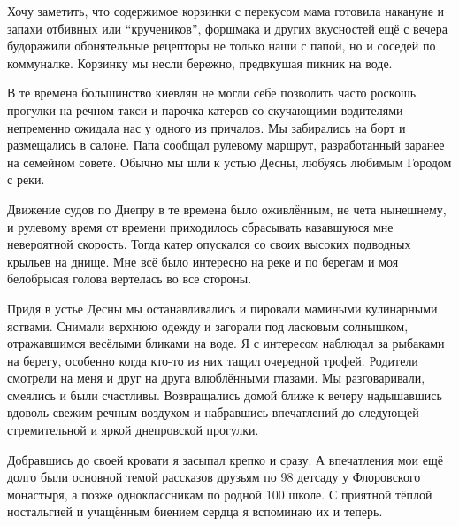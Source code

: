Хочу заметить, что содержимое корзинки с перекусом мама готовила накануне и
запахи отбивных или \enquote{кручеников}, форшмака и других вкусностей ещё с
вечера будоражили обонятельные рецепторы не только наши с папой, но и соседей
по коммуналке. Корзинку мы несли бережно, предвкушая пикник на воде. 

В те времена большинство киевлян не могли себе позволить часто роскошь прогулки
на речном такси и парочка катеров со скучающими водителями непременно ожидала
нас у одного из причалов. Мы забирались на борт и размещались в салоне. Папа
сообщал рулевому маршрут, разработанный заранее на семейном совете. Обычно мы
шли к устью Десны, любуясь любимым Городом с реки.

Движение судов по Днепру в те времена было оживлённым, не чета нынешнему, и
рулевому время от времени приходилось сбрасывать казавшуюся мне невероятной
скорость. Тогда катер опускался со своих высоких подводных крыльев на днище.
Мне всё было интересно на реке и по берегам и моя белобрысая голова вертелась
во все стороны. 

Придя в устье Десны мы останавливались и пировали мамиными кулинарными яствами.
Снимали верхнюю одежду и загорали под ласковым солнышком, отражавшимся весёлыми
бликами на воде. Я с интересом наблюдал за рыбаками на берегу, особенно когда
кто-то из них тащил очередной трофей. Родители смотрели на меня и друг на друга
влюблёнными глазами. Мы разговаривали, смеялись и были счастливы. Возвращались
домой ближе к вечеру надышавшись вдоволь свежим речным воздухом и набравшись
впечатлений до следующей стремительной и яркой днепровской прогулки. 

Добравшись до своей кровати я засыпал крепко и сразу. А впечатления мои ещё
долго были основной темой рассказов друзьям по 98 детсаду у Флоровского
монастыря, а позже одноклассникам по родной 100 школе. С приятной тёплой
ностальгией и учащённым биением сердца я вспоминаю их и теперь.

